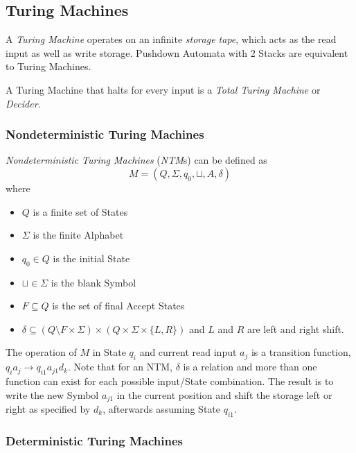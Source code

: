 \subsection{Turing Machines}\label{sec:turing_machine}

A \emph{Turing Machine} operates on an infinite \emph{storage tape},
which acts as the read input as well as write storage. Pushdown
Automata with 2 Stacks are equivalent to Turing Machines.

A Turing Machine that halts for every input is a \emph{Total Turing
  Machine} or \emph{Decider}.



\subsubsection{Nondeterministic Turing Machines}

\emph{Nondeterministic Turing Machines} (\emph{NTM}s) can be defined
as
    \[
        M = (Q, \Sigma, q_0, \sqcup, A, \delta)
    \]
where
\begin{itemize}
\item $Q$ is a finite set of States
\item $\Sigma$ is the finite Alphabet
\item $q_0 \in Q$ is the initial State
\item $\sqcup \in \Sigma$ is the blank Symbol
\item $F \subseteq Q$ is the set of final Accept States
\item $\delta \subseteq (Q \setminus F \times \Sigma) \times (Q \times
  \Sigma \times \{L,R\})$ and $L$ and $R$ are left and right shift.
\end{itemize}

The operation of $M$ in State $q_i$ and current read input $a_j$ is a
transition function, $q_i a_j \rightarrow q_{i1} a_{j1} d_k$. Note
that for an NTM, $\delta$ is a relation and more than one function can
exist for each possible input/State combination. The result is to
write the new Symbol $a_{j1}$ in the current position and shift the
storage left or right as specified by $d_k$, afterwards assuming State
$q_{i1}$.



\subsubsection{Deterministic Turing Machines}

